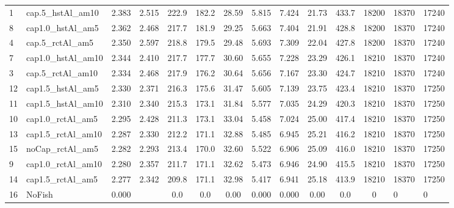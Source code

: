 \documentclass[11pt]{book}
\begin{document}
\begin{landscape}
\begin{longtable}[t]{llccccccccccll}
1 & cap.5\_hstAl\_am10 & 2.383 & 2.515 & 222.9 & 182.2 & 28.59 & 5.815 & 7.424 & 21.73 & 433.7 & 18200 & 18370 & 17240\\
8 & cap1.0\_hstAl\_am5 & 2.362 & 2.468 & 217.7 & 181.9 & 29.25 & 5.663 & 7.404 & 21.91 & 428.8 & 18200 & 18370 & 17240\\
4 & cap.5\_rctAl\_am5 & 2.350 & 2.597 & 218.8 & 179.5 & 29.48 & 5.693 & 7.309 & 22.04 & 427.8 & 18200 & 18370 & 17240\\
7 & cap1.0\_hstAl\_am10 & 2.344 & 2.410 & 217.7 & 177.7 & 30.60 & 5.655 & 7.228 & 23.29 & 426.1 & 18210 & 18370 & 17240\\
3 & cap.5\_rctAl\_am10 & 2.334 & 2.468 & 217.9 & 176.2 & 30.64 & 5.656 & 7.167 & 23.30 & 424.7 & 18210 & 18370 & 17240\\
12 & cap1.5\_hstAl\_am5 & 2.330 & 2.371 & 216.3 & 175.6 & 31.47 & 5.605 & 7.139 & 23.75 & 423.4 & 18210 & 18370 & 17250\\
11 & cap1.5\_hstAl\_am10 & 2.310 & 2.340 & 215.3 & 173.1 & 31.84 & 5.577 & 7.035 & 24.29 & 420.3 & 18210 & 18370 & 17250\\
10 & cap1.0\_rctAl\_am5 & 2.295 & 2.428 & 211.3 & 173.1 & 33.04 & 5.458 & 7.024 & 25.00 & 417.4 & 18210 & 18370 & 17250\\
13 & cap1.5\_rctAl\_am10 & 2.287 & 2.330 & 212.2 & 171.1 & 32.88 & 5.485 & 6.945 & 25.21 & 416.2 & 18210 & 18370 & 17250\\
15 & noCap\_rctAl\_am5 & 2.282 & 2.293 & 213.4 & 170.0 & 32.60 & 5.522 & 6.906 & 25.09 & 416.0 & 18210 & 18370 & 17250\\
9 & cap1.0\_rctAl\_am10 & 2.280 & 2.357 & 211.7 & 171.1 & 32.62 & 5.473 & 6.946 & 24.90 & 415.5 & 18210 & 18370 & 17250\\
14 & cap1.5\_rctAl\_am5 & 2.277 & 2.342 & 209.8 & 171.1 & 32.98 & 5.417 & 6.941 & 25.18 & 413.9 & 18210 & 18370 & 17250\\
16 & NoFish & 0.000 &  & 0.0 & 0.0 & 0.00 & 0.000 & 0.000 & 0.00 & 0.0 & 0 & 0 & 0\\*
\end{longtable}
\end{landscape}
\endgroup{}

\newpage
\end{document}
